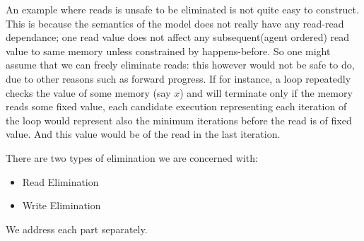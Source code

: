     An example where reads is unsafe to be eliminated is not quite easy to construct.
    This is because the semantics of the model does not really have any read-read dependance; one read value does not affect any subsequent(agent ordered) read value to same memory unless constrained by happens-before.
    So one might assume that we can freely eliminate reads: this however would not be safe to do, due to other reasons such as forward progress.
    If for instance, a loop repeatedly checks the value of some memory (say $x$) and will terminate only if the memory reads some fixed value, each candidate execution representing each iteration of the loop would represent also the minimum iterations before the read is of fixed value. 
    And this value would be of the read in the last iteration. 
    

    There are two types of elimination we are concerned with:
    \begin{itemize}
        \item Read Elimination
        \item Write Elimination
    \end{itemize}

    We address each part separately.
